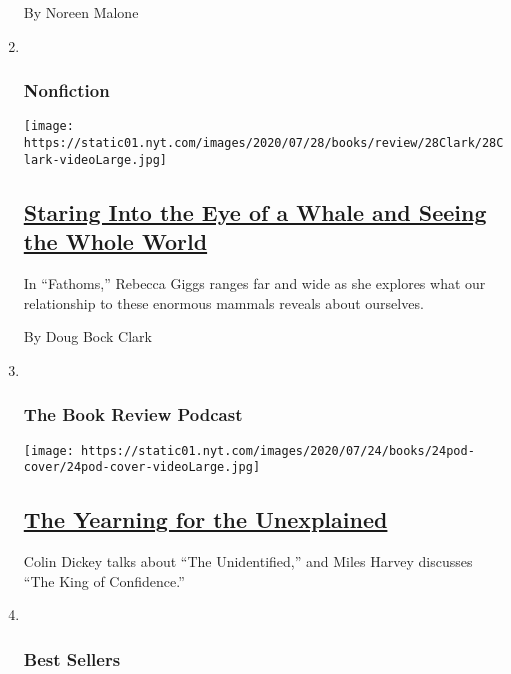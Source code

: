 \begin{enumerate}
  By Noreen Malone
\item ~
  \hypertarget{nonfiction-1}{%
  \subsubsection{Nonfiction}\label{nonfiction-1}}

  \texttt{[image: https://static01.nyt.com/images/2020/07/28/books/review/28Clark/28Clark-videoLarge.jpg]}

  \hypertarget{staring-into-the-eye-of-a-whale-and-seeing-the-whole-world}{%
  \subsection{\texorpdfstring{\href{/2020/07/28/books/review/fathoms-whale-rebecca-giggs.html}{Staring
  Into the Eye of a Whale and Seeing the Whole
  World}}{Staring Into the Eye of a Whale and Seeing the Whole World}}\label{staring-into-the-eye-of-a-whale-and-seeing-the-whole-world}}

  In ``Fathoms,'' Rebecca Giggs ranges far and wide as she explores what
  our relationship to these enormous mammals reveals about ourselves.

  By Doug Bock Clark
\item ~
  \hypertarget{the-book-review-podcast}{%
  \subsubsection{The Book Review
  Podcast}\label{the-book-review-podcast}}

  \texttt{[image: https://static01.nyt.com/images/2020/07/24/books/24pod-cover/24pod-cover-videoLarge.jpg]}

  \hypertarget{the-yearning-for-the-unexplained}{%
  \subsection{\texorpdfstring{\href{/2020/07/24/books/review/podcast-colin-dickey-unexplained-miles-harvey-king-of-confidence.html}{The
  Yearning for the
  Unexplained}}{The Yearning for the Unexplained}}\label{the-yearning-for-the-unexplained}}

  Colin Dickey talks about ``The Unidentified,'' and Miles Harvey
  discusses ``The King of Confidence.''
\item ~
  \hypertarget{best-sellers}{%
  \subsubsection{Best Sellers}\label{best-sellers}}


\end{enumerate}
